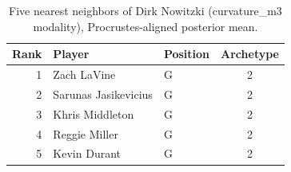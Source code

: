\begin{table}[htbp]
  \centering\small
  \begin{tabular}{rllc}
    \toprule
    Rank & Player & Position & Archetype \\
    \midrule
    1 & Zach LaVine & G & 2 \\
    2 & Sarunas Jasikevicius & G & 2 \\
    3 & Khris Middleton & G & 2 \\
    4 & Reggie Miller & G & 2 \\
    5 & Kevin Durant & G & 2 \\
    \bottomrule
  \end{tabular}
  \caption{Five nearest neighbors of Dirk Nowitzki (curvature_m3 modality), Procrustes-aligned posterior mean.}
  \label{tab:Dirk_Nowitzki_neighbors_curvature_m3}
\end{table}

